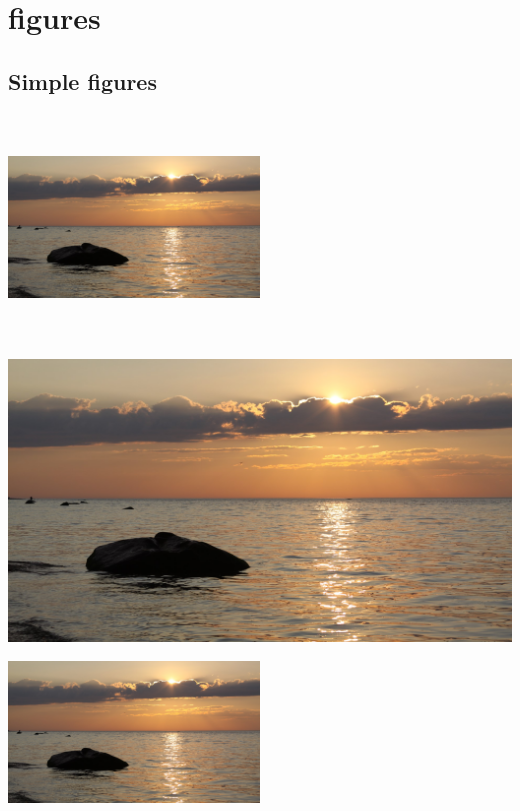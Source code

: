 \documentclass[12pt]{report}
\begin{document}
\listoffigures %

\chapter{figures}
\section{Simple figures}

\includegraphics[height = 6cm, width = 0.5\textwidth]{demo} %

\vspace{2em}

\includegraphics[scale = 0.1, angle = 45]{demo} 

\includegraphics[width=0.5\textwidth, right]{demo} %
\end{document}
